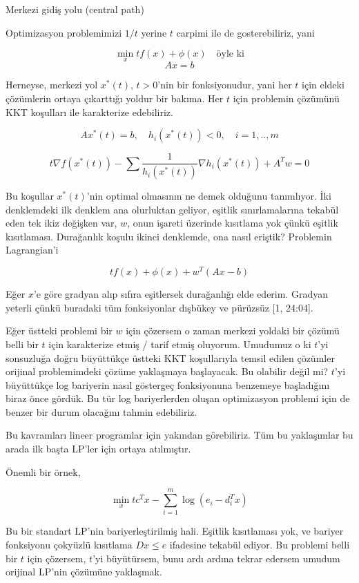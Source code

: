 \documentclass[12pt,fleqn]{article}\usepackage{../../common}
\begin{document}
Merkezi gidiş yolu (central path)

Optimizasyon problemimizi $1/t$ yerine $t$ carpimi ile de gosterebiliriz,
yani

$$
\min_x t f(x) + \phi(x) \quad \textrm{öyle ki}
$$
$$
Ax = b
$$

Herneyse, merkezi yol $x^*(t)$, $t>0$'nin bir fonksiyonudur, yani her $t$
için eldeki çözümlerin ortaya çıkarttığı yoldur bir bakıma. Her $t$ için
problemin çözümünü KKT koşulları ile karakterize edebiliriz. 

$$
Ax^*(t) = b, \quad h_i(x^*(t)) < 0, \quad i=1,..,m
$$

$$
t \nabla f(x^*(t)) - \sum \frac{1}{h_i(x^*(t))} \nabla h_i(x^*(t)) + A^T w= 0
$$

Bu koşullar $x^*(t)$'nin optimal olmasının ne demek olduğunu
tanımlıyor. İki denklemdeki ilk denklem ana olurluktan geliyor, eşitlik
sınırlamalarına tekabül eden tek ikiz değişken var, $w$, onun işareti
üzerinde kısıtlama yok çünkü eşitlik kısıtlaması. Durağanlık koşulu ikinci
denklemde, ona nasıl eriştik? Problemin Lagrangian'i

$$
t f(x) + \phi(x) + w^T (Ax - b)
$$

Eğer $x$'e göre gradyan alıp sıfıra eşitlersek durağanlığı elde
ederim. Gradyan yeterli çünkü buradaki tüm fonksiyonlar dışbükey ve
pürüzsüz [1, 24:04]. 

Eğer üstteki problemi bir $w$ için çözersem o zaman merkezi yoldaki bir
çözümü belli bir $t$ için karakterize etmiş / tarif etmiş
oluyorum. Umudumuz o ki $t$'yi sonsuzluğa doğru büyüttükçe üstteki KKT
koşullarıyla temsil edilen çözümler orijinal problemimdeki çözüme
yaklaşmaya başlayacak. Bu olabilir değil mi? $t$'yi büyüttükçe log
bariyerin nasıl göstergeç fonksiyonuna benzemeye başladığını biraz önce
gördük. Bu tür log bariyerlerden oluşan optimizasyon problemi için de
benzer bir durum olacağını tahmin edebiliriz. 

Bu kavramları lineer programlar için yakından görebiliriz. Tüm bu
yaklaşımlar bu arada ilk başta LP'ler için ortaya atılmıştır. 

Önemli bir örnek,

$$
\min_x t c^T x - \sum _{i=1}^{m} \log(e_i - d_i^T x)
$$

Bu bir standart LP'nin bariyerleştirilmiş hali. Eşitlik kısıtlaması yok, ve
bariyer fonksiyonu çokyüzlü kısıtlama  $D x \le e$ ifadesine tekabül
ediyor. Bu problemi belli bir $t$ için çözersem, $t$'yi büyütürsem, bunu
ardı ardına tekrar edersem umudum orijinal LP'nin çözümüne yaklaşmak. 
\end{document}

